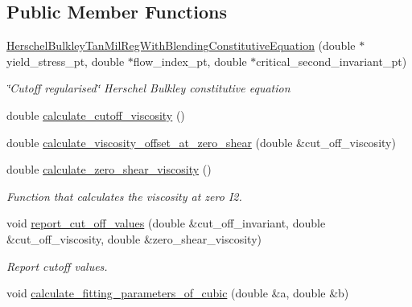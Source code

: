 \subsection*{Public Member Functions}
\begin{DoxyCompactItemize}
\item 
\hyperlink{classoomph_1_1HerschelBulkleyTanMilRegWithBlendingConstitutiveEquation_a2d0011d44b05f948caa84c2ad0e8e907}{Herschel\+Bulkley\+Tan\+Mil\+Reg\+With\+Blending\+Constitutive\+Equation} (double $\ast$yield\+\_\+stress\+\_\+pt, double $\ast$flow\+\_\+index\+\_\+pt, double $\ast$critical\+\_\+second\+\_\+invariant\+\_\+pt)
\begin{DoxyCompactList}\small\item\em \char`\"{}\+Cutoff regularised\char`\"{} Herschel Bulkley constitutive equation \end{DoxyCompactList}\item 
double \hyperlink{classoomph_1_1HerschelBulkleyTanMilRegWithBlendingConstitutiveEquation_a505f8b8eba6c70c101087c8809953e51}{calculate\+\_\+cutoff\+\_\+viscosity} ()
\item 
double \hyperlink{classoomph_1_1HerschelBulkleyTanMilRegWithBlendingConstitutiveEquation_a07a46a098143ce1d260da313a4d8ee01}{calculate\+\_\+viscosity\+\_\+offset\+\_\+at\+\_\+zero\+\_\+shear} (double \&cut\+\_\+off\+\_\+viscosity)
\item 
double \hyperlink{classoomph_1_1HerschelBulkleyTanMilRegWithBlendingConstitutiveEquation_abdb90aeb25f63f03cef5e0a070da0cd5}{calculate\+\_\+zero\+\_\+shear\+\_\+viscosity} ()
\begin{DoxyCompactList}\small\item\em Function that calculates the viscosity at zero I2. \end{DoxyCompactList}\item 
void \hyperlink{classoomph_1_1HerschelBulkleyTanMilRegWithBlendingConstitutiveEquation_aa53287839852e8fe36575cc593327499}{report\+\_\+cut\+\_\+off\+\_\+values} (double \&cut\+\_\+off\+\_\+invariant, double \&cut\+\_\+off\+\_\+viscosity, double \&zero\+\_\+shear\+\_\+viscosity)
\begin{DoxyCompactList}\small\item\em Report cutoff values. \end{DoxyCompactList}\item 
void \hyperlink{classoomph_1_1HerschelBulkleyTanMilRegWithBlendingConstitutiveEquation_a0d44d0467ca5f9c1a6a0a111cf2b41ee}{calculate\+\_\+fitting\+\_\+parameters\+\_\+of\+\_\+cubic} (double \&a, double \&b)

\end{DoxyCompactItemize}

